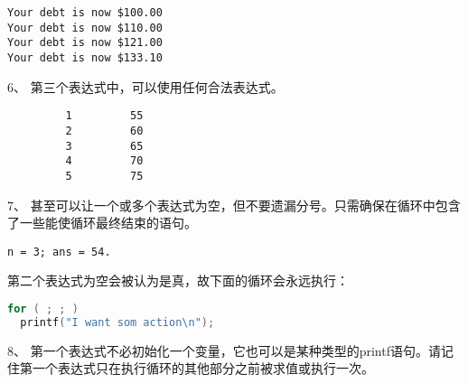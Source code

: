 \begin{frame}[fragile]
\begin{lstlisting}
Your debt is now $100.00
Your debt is now $110.00
Your debt is now $121.00
Your debt is now $133.10
\end{lstlisting}
\end{frame}

\begin{frame}[fragile]
6、 第三个表达式中，可以使用任何合法表达式。

\end{frame}

\begin{frame}[fragile]
\begin{lstlisting}
         1         55
         2         60
         3         65
         4         70
         5         75
\end{lstlisting}
\end{frame}

\begin{frame}[fragile]
7、 甚至可以让一个或多个表达式为空，但不要遗漏分号。只需确保在循环中包含了一些能使循环最终结束的语句。
\end{frame}

\begin{frame}[fragile]
  
\end{frame}

\begin{frame}[fragile]

\begin{lstlisting}
n = 3; ans = 54.
\end{lstlisting}
\end{frame}

\begin{frame}[fragile]
第二个表达式为空会被认为是真，故下面的循环会永远执行：
\begin{lstlisting}[language=c,backgroundcolor=\color{red!10}]
for ( ; ; )
  printf("I want som action\n");
\end{lstlisting}

\end{frame}

\begin{frame}[fragile]
8、 第一个表达式不必初始化一个变量，它也可以是某种类型的printf语句。请记住第一个表达式只在执行循环的其他部分之前被求值或执行一次。
\end{frame}


